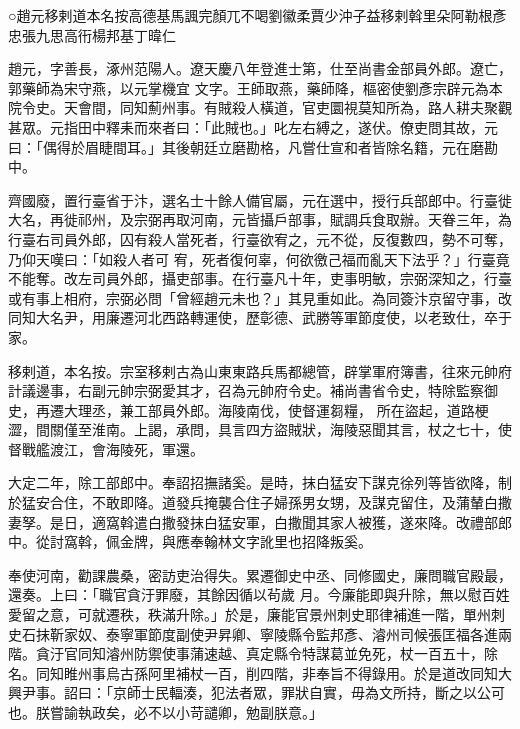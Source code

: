 
\begin{pinyinscope}

 ○趙元移剌道本名按高德基馬諷完顏兀不喝劉徽柔賈少沖子益移剌斡里朵阿勒根彥忠張九思高衎楊邦基丁暐仁



 趙元，字善長，涿州范陽人。遼天慶八年登進士第，仕至尚書金部員外郎。遼亡，郭藥師為宋守燕，以元掌機宜
 文字。王師取燕，藥師降，樞密使劉彥宗辟元為本院令史。天會間，同知薊州事。有賊殺人橫道，官吏圜視莫知所為，路人耕夫聚觀甚眾。元指田中釋耒而來者曰：「此賊也。」叱左右縛之，遂伏。僚吏問其故，元曰：「偶得於眉睫間耳。」其後朝廷立磨勘格，凡嘗仕宣和者皆除名籍，元在磨勘中。



 齊國廢，置行臺省于汴，選名士十餘人備官屬，元在選中，授行兵部郎中。行臺徙大名，再徙祁州，及宗弼再取河南，元皆攝戶部事，賦調兵食取辦。天眷三年，為行臺右司員外郎，囚有殺人當死者，行臺欲宥之，元不從，反復數四，勢不可奪，乃仰天嘆曰：「如殺人者可
 宥，死者復何辜，何欲徼己福而亂天下法乎？」行臺竟不能奪。改左司員外郎，攝吏部事。在行臺凡十年，吏事明敏，宗弼深知之，行臺或有事上相府，宗弼必問「曾經趙元未也？」其見重如此。為同簽汴京留守事，改同知大名尹，用廉遷河北西路轉運使，歷彰德、武勝等軍節度使，以老致仕，卒于家。



 移剌道，本名按。宗室移剌古為山東東路兵馬都總管，辟掌軍府簿書，往來元帥府計議邊事，右副元帥宗弼愛其才，召為元帥府令史。補尚書省令史，特除監察御史，再遷大理丞，兼工部員外郎。海陵南伐，使督運芻糧，
 所在盜起，道路梗澀，間關僅至淮南。上謁，承問，具言四方盜賊狀，海陵惡聞其言，杖之七十，使督戰艦渡江，會海陵死，軍還。



 大定二年，除工部郎中。奉詔招撫諸奚。是時，抹白猛安下謀克徐列等皆欲降，制於猛安合住，不敢即降。道發兵掩襲合住子婦孫男女甥，及謀克留住，及蒲輦白撒妻孥。是日，適窩斡遣白撒發抹白猛安軍，白撒聞其家人被獲，遂來降。改禮部郎中。從討窩斡，佩金牌，與應奉翰林文字訛里也招降叛奚。



 奉使河南，勸課農桑，密訪吏治得失。累遷御史中丞、同修國史，廉問職官殿最，還奏。上曰：「職官貪汙罪廢，其餘因循以茍歲
 月。今廉能即與升除，無以慰百姓愛留之意，可就遷秩，秩滿升除。」於是，廉能官景州刺史耶律補進一階，單州刺史石抹靳家奴、泰寧軍節度副使尹昇卿、寧陵縣令監邦彥、濬州司候張匡福各進兩階。貪汙官同知濬州防禦使事蒲速越、真定縣令特謀葛並免死，杖一百五十，除名。同知睢州事烏古孫阿里補杖一百，削四階，非奉旨不得錄用。於是道改同知大興尹事。詔曰：「京師士民輻湊，犯法者眾，罪狀自實，毋為文所持，斷之以公可也。朕嘗諭執政矣，必不以小苛譴卿，勉副朕意。」




\end{pinyinscope}
